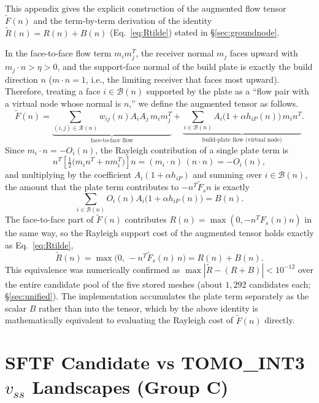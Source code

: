 \documentclass[11pt,a4paper]{article}
\begin{document}
This appendix gives the explicit construction of the augmented flow tensor $\tilde F(n)$ and the term-by-term
derivation of the identity $\tilde R(n)=R(n)+B(n)$ (Eq.~\eqref{eq:Rtilde}) stated in \S\ref{sec:groundnode}.

In the face-to-face flow term $m_im_j^T$, the receiver normal $m_j$ faces upward with $m_j\cdot n>\eta>0$,
and the support-face normal of the build plate is exactly the build direction $n$
($m\cdot n=1$, i.e., the limiting receiver that faces most upward).
Therefore, treating a face $i\in\mathcal{B}(n)$ supported by the plate as a ``flow pair with a virtual node whose normal is $n$,''
we define the augmented tensor as follows.
\begin{equation}
\tilde F(n)
=
\underbrace{\sum_{(i,j)\in\mathcal{R}(n)} w_{ij}(n)A_iA_j\,m_im_j^T}_{\text{face-to-face flow}}
+
\underbrace{\sum_{i\in\mathcal{B}(n)} A_i\big(1+\alpha h_{iP}(n)\big)\,m_in^T}_{\text{build-plate flow (virtual node)}}.
\label{eq:Ftilde}
\end{equation}
Since $m_i\cdot n=-O_i(n)$, the Rayleigh contribution of a single plate term is
\begin{equation}
n^T\!\left[\tfrac{1}{2}\big(m_in^T+nm_i^T\big)\right]\!n
= (m_i\cdot n)\,(n\cdot n) = -O_i(n),
\end{equation}
and multiplying by the coefficient $A_i(1+\alpha h_{iP})$ and summing over $i\in\mathcal{B}(n)$,
the amount that the plate term contributes to $-n^T\tilde F_s n$ is exactly
\begin{equation}
\sum_{i\in\mathcal{B}(n)} O_i(n)A_i\big(1+\alpha h_{iP}(n)\big) = B(n).
\end{equation}
The face-to-face part of $\tilde F(n)$ contributes $R(n)=\max(0,-n^TF_s(n)n)$ in the same way,
so the Rayleigh support cost of the augmented tensor holds exactly as Eq.~\eqref{eq:Rtilde},
\begin{equation*}
\tilde R(n)
=
\max\!\big(0,\,-n^T\tilde F_s(n)\,n\big)
=
R(n)+B(n).
\end{equation*}
This equivalence was numerically confirmed as $\max|\tilde R-(R+B)|<10^{-12}$ over the entire candidate pool
of the five stored meshes (about $1{,}292$ candidates each; \S\ref{sec:unified}).
The implementation accumulates the plate term separately as the scalar $B$ rather than into the tensor,
which by the above identity is mathematically equivalent to evaluating the Rayleigh cost of $\tilde F(n)$ directly.

\section{SFTF Candidate vs TOMO\_INT3 $v_{ss}$ Landscapes (Group C)}
\label{sec:appendix-landscape}
\end{document}
